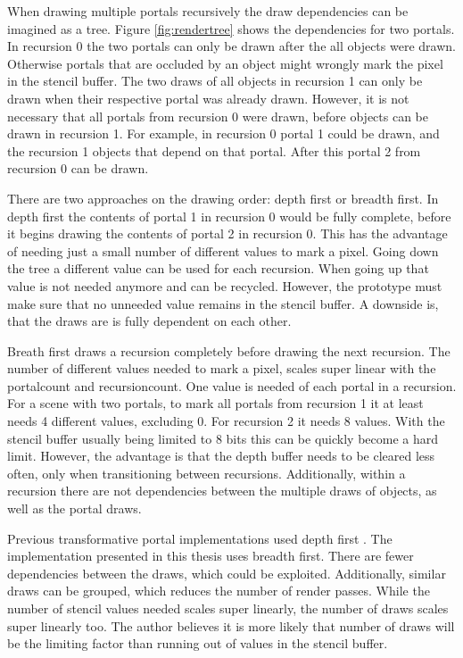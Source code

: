 When drawing multiple portals recursively the draw dependencies can be imagined as a tree. Figure \ref{fig:rendertree} shows the dependencies for two portals. In recursion 0 the two portals can only be drawn after the all objects were drawn. Otherwise portals that are occluded by an object might wrongly mark the pixel in the stencil buffer. The two draws of all objects in recursion 1 can only be drawn when their respective portal was already drawn. However, it is not necessary that all portals from recursion 0 were drawn, before objects can be drawn in recursion 1. For example, in recursion 0 portal 1 could be drawn, and the recursion 1 objects that depend on that portal. After this portal 2 from recursion 0 can be drawn.

There are two approaches on the drawing order: depth first or breadth first. In depth first the contents of portal 1 in recursion 0 would be fully complete, before it begins drawing the contents of portal 2 in recursion 0. This has the advantage of needing just a small number of different values to mark a pixel. Going down the tree a different value can be used for each recursion. When going up that value is not needed anymore and can be recycled. However, the prototype must make sure that no unneeded value remains in the stencil buffer. A downside is, that the draws are is fully dependent on each other.

Breath first draws a recursion completely before drawing the next recursion. The number of different values needed to mark a pixel, scales super linear with the \gls{portalcount} and \gls{recursioncount}. One value is needed of each portal in a recursion. For a scene with two portals, to mark all portals from recursion 1 it at least needs 4 different values, excluding 0. For recursion 2 it needs 8 values. With the stencil buffer usually being limited to 8 bits this can be quickly become a hard limit. However, the advantage is that the depth buffer needs to be cleared less often, only when transitioning between recursions. Additionally, within a recursion there are not dependencies between the multiple draws of objects, as well as the portal draws.

Previous transformative portal implementations used depth first \cite{lowe:2005:technique,lecture:portalProblems}. The implementation presented in this thesis uses breadth first. There are fewer dependencies between the draws, which could be exploited. Additionally, similar draws can be grouped, which reduces the number of render passes. While the number of stencil values needed scales super linearly, the number of draws scales super linearly too. The author believes it is more likely that number of draws will be the limiting factor than running out of values in the stencil buffer.



